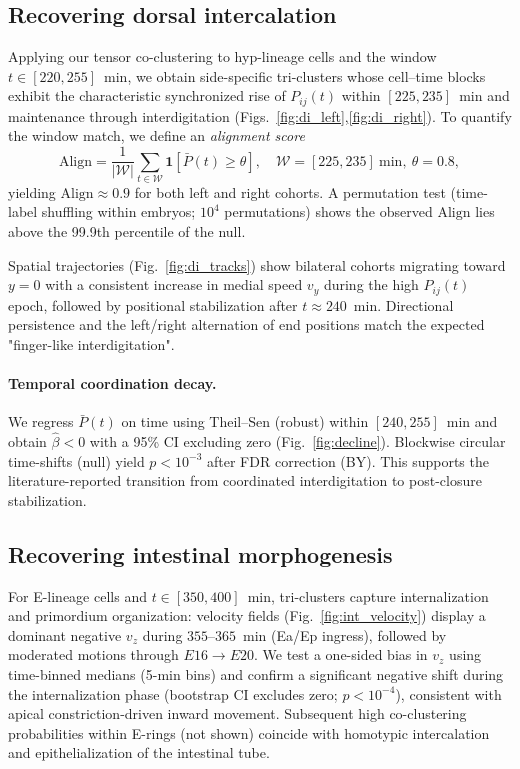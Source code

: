 \documentclass[unnumsec,webpdf,modern,large,namedate]{oup-authoring-template}%
\theoremstyle{thmstyleone}\newtheorem{theorem}{Theorem}
\theoremstyle{thmstyletwo}\newtheorem{example}{Example}
\theoremstyle{thmstylethree}\newtheorem{definition}{Definition}
\begin{document}
\subsection{Recovering dorsal intercalation}
\label{subsec:val_dorsal}
Applying our tensor co-clustering to hyp-lineage cells and the window $t\in[220,255]$~min, we obtain side-specific tri-clusters whose cell--time blocks exhibit the characteristic synchronized rise of $P_{ij}(t)$ within $[225,235]$~min and maintenance through interdigitation (Figs.~\ref{fig:di_left},\ref{fig:di_right}). To quantify the window match, we define an \emph{alignment score}
\begin{equation}
\mathrm{Align}=\frac{1}{|\mathcal{W}|}\sum_{t\in\mathcal{W}}\mathbf{1}\!\left[\bar{P}(t)\geq \theta\right],\quad \mathcal{W}=[225,235]\ \mathrm{min},\ \theta=0.8,
\label{eq:align}
\end{equation}
yielding $\mathrm{Align}\approx 0.9$ for both left and right cohorts. A permutation test (time-label shuffling within embryos; $10^4$ permutations) shows the observed $\mathrm{Align}$ lies above the 99.9th percentile of the null.

Spatial trajectories (Fig.~\ref{fig:di_tracks}) show bilateral cohorts migrating toward $y=0$ with a consistent increase in medial speed $v_y$ during the high $P_{ij}(t)$ epoch, followed by positional stabilization after $t\approx 240$~min. Directional persistence and the left/right alternation of end positions match the expected "finger-like interdigitation".

\paragraph{Temporal coordination decay.}
We regress $\bar{P}(t)$ on time using Theil–Sen (robust) within $[240,255]$~min and obtain $\hat{\beta}<0$ with a 95\% CI excluding zero (Fig.~\ref{fig:decline}). Blockwise circular time-shifts (null) yield $p<10^{-3}$ after FDR correction (BY). This supports the literature-reported transition from coordinated interdigitation to post-closure stabilization.

\subsection{Recovering intestinal morphogenesis}
\label{subsec:val_int}
For E-lineage cells and $t\in[350,400]$~min, tri-clusters capture internalization and primordium organization: velocity fields (Fig.~\ref{fig:int_velocity}) display a dominant negative $v_z$ during $355$--$365$~min (Ea/Ep ingress), followed by moderated motions through $E16\to E20$. We test a one-sided bias in $v_z$ using time-binned medians (5-min bins) and confirm a significant negative shift during the internalization phase (bootstrap CI excludes zero; $p<10^{-4}$), consistent with apical constriction-driven inward movement. Subsequent high co-clustering probabilities within E-rings (not shown) coincide with homotypic intercalation and epithelialization of the intestinal tube.
\end{document}
